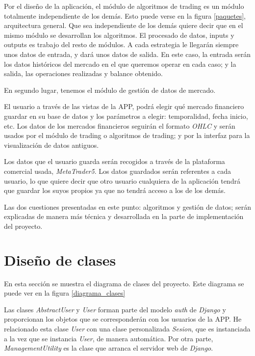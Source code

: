 Por el diseño de la aplicación, el módulo de algoritmos de trading es un módulo totalmente independiente de los demás. Esto puede verse en la figura \ref{paquetes}, arquitectura general. Que sea independiente de los demás quiere decir que en el mismo módulo se desarrollan los algoritmos. El procesado de datos, inputs y outputs es trabajo del resto de módulos. A cada estrategia le llegarán siempre unos datos de entrada, y dará unos datos de salida. En este caso, la entrada serán los datos históricos del mercado en el que queremos operar en cada caso; y la salida, las operaciones realizadas y balance obtenido.\newline

En segundo lugar, tenemos el módulo de gestión de datos de mercado.\newline

El usuario a través de las vistas de la APP, podrá elegir qué mercado financiero guardar en su base de datos y los parámetros a elegir: temporalidad, fecha inicio, etc. Los datos de los mercados financieros seguirán el formato \textit{OHLC} y serán usados por el módulo de trading o algoritmos de trading; y por la interfaz para la visualización de datos antiguos.\newline

Los datos que el usuario guarda serán recogidos a través de la plataforma comercial usada, \textit{MetaTrader5}. Los datos guardados serán referentes a cada usuario, lo que quiere decir que otro usuario cualquiera de la aplicación tendrá que guardar los suyos propios ya que no tendrá acceso a los de los demás.\newline

Las dos cuestiones presentadas en este punto: algoritmos y gestión de datos; serán explicadas de manera más técnica y desarrollada en la parte de implementación del proyecto.\newline



\section{Diseño de clases}

En esta sección se muestra el diagrama de clases del proyecto. Este diagrama se puede ver en la figura \ref{diagrama_clases} \newline

Las clases \textit{AbstractUser} y \textit{User} forman parte del modelo \textit{auth} de \textit{Django} y proporcionan los objetos que se corresponderán con los usuarios de la APP. He relacionado esta clase \textit{User} con una clase personalizada \textit{Sesion}, que es instanciada a la vez que se instancia \textit{User}, de manera automática. Por otra parte, \textit{ManagementUtility} es la clase que arranca el servidor web de \textit{Django}.\newline

